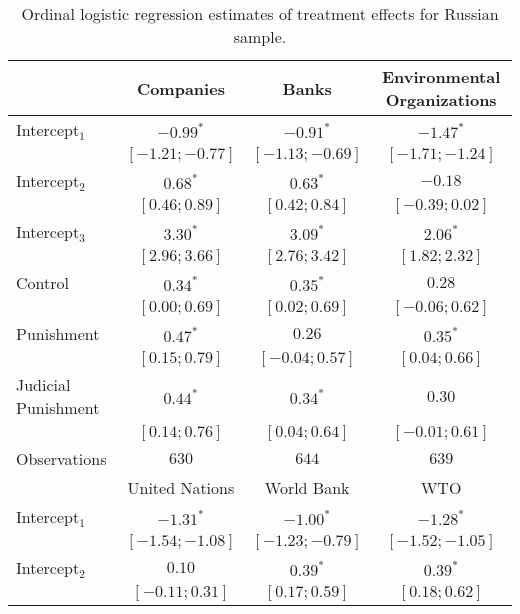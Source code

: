 \begin{table}[h]
\begin{center}
\caption{Ordinal logistic regression estimates of treatment effects for Russian sample.}
\begin{threeparttable}
\begin{tabular}{l c c c}
\hline
 & Companies & Banks & Environmental
Organizations \\
\hline
Intercept$_1$       & $-0.99^{*}$       & $-0.91^{*}$       & $-1.47^{*}$       \\
                    & $ [-1.21; -0.77]$ & $ [-1.13; -0.69]$ & $ [-1.71; -1.24]$ \\
Intercept$_2$       & $0.68^{*}$        & $0.63^{*}$        & $-0.18$           \\
                    & $ [ 0.46;  0.89]$ & $ [ 0.42;  0.84]$ & $ [-0.39;  0.02]$ \\
Intercept$_3$       & $3.30^{*}$        & $3.09^{*}$        & $2.06^{*}$        \\
                    & $ [ 2.96;  3.66]$ & $ [ 2.76;  3.42]$ & $ [ 1.82;  2.32]$ \\
Control             & $0.34^{*}$        & $0.35^{*}$        & $0.28$            \\
                    & $ [ 0.00;  0.69]$ & $ [ 0.02;  0.69]$ & $ [-0.06;  0.62]$ \\
Punishment          & $0.47^{*}$        & $0.26$            & $0.35^{*}$        \\
                    & $ [ 0.15;  0.79]$ & $ [-0.04;  0.57]$ & $ [ 0.04;  0.66]$ \\
Judicial Punishment & $0.44^{*}$        & $0.34^{*}$        & $0.30$            \\
                    & $ [ 0.14;  0.76]$ & $ [ 0.04;  0.64]$ & $ [-0.01;  0.61]$ \\
\hline
Observations        & $630$             & $644$             & $639$             \\
\hline
 & United Nations & World Bank & WTO \\
\hline
Intercept$_1$       & $-1.31^{*}$       & $-1.00^{*}$       & $-1.28^{*}$       \\
                    & $ [-1.54; -1.08]$ & $ [-1.23; -0.79]$ & $ [-1.52; -1.05]$ \\
Intercept$_2$       & $0.10$            & $0.39^{*}$        & $0.39^{*}$        \\
                    & $ [-0.11;  0.31]$ & $ [ 0.17;  0.59]$ & $ [ 0.18;  0.62]$ \\

\end{tabular}
\end{threeparttable}
\end{center}
\end{table}
